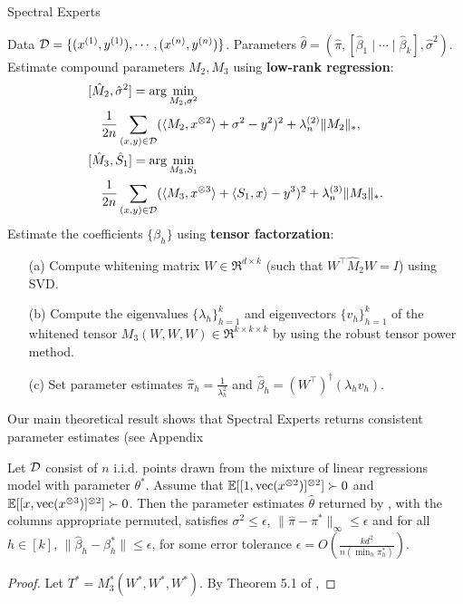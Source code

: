 \begin{algorithm}[t]
  \caption{Spectral Experts}
  \label{algo:spectral-experts}
  \begin{algorithmic}[1]
    \INPUT Data $\mathcal{D} = \{ (x^{(1)}, y^{(1)}), \cdots, (x^{(n)}, y^{(n)}) \}$.
    \OUTPUT Parameters $\hat\theta = (\hat \pi, [\hat \beta_1 \mid \cdots \mid \hat \beta_k], \hat\sigma^2)$.
    \STATE Estimate compound parameters $M_2, M_3$ using \textbf{low-rank regression}:
    \begin{align}
      &[\hat M_2, \hat \sigma^2] = \arg\min_{M_2,\sigma^2} \label{eqn:estimateM2} \\
      &\quad\frac{1}{2n} \sum_{(x,y) \in \mathcal{D}} (\langle M_2, x^{\otimes 2} \rangle + \sigma^2 - y^2)^2 + \lambda_n^{(2)} \|M_2\|_*, \nonumber \\
       &[\hat M_3, \hat S_1] = \arg\min_{M_3,S_1} \label{eqn:estimateM3} \\
       &\quad\frac{1}{2n} \sum_{(x,y) \in \mathcal{D}} (\langle M_3, x^{\otimes 3} \rangle + \langle S_1, x \rangle - y^3)^2 + \lambda_n^{(3)} \|M_3\|_*. \nonumber
    \end{align}
    \STATE Estimate the coefficients $\{\beta_h\}$ using \textbf{tensor factorzation}:
    \begin{enumerate}
      \item [(a)] Compute whitening matrix $W \in \Re^{d \times k}$ (such that $W^\top
      \hat M_2 W = I$) using SVD.
      \item [(b)] Compute the eigenvalues $\{\lambda_h\}_{h=1}^k$
      and eigenvectors $\{v_h\}_{h=1}^k$
      of the whitened tensor $M_3(W, W, W) \in \Re^{k \times k \times k}$
      by using the robust tensor power method.
    \item [(c)] Set parameter estimates $\hat\pi_h = \frac{1}{\lambda_h^2}$
    and $\hat\beta_h = (W^{\top})^\dagger (\lambda_h v_h)$.
    \end{enumerate}
  \end{algorithmic}
\end{algorithm}

Our main theoretical result shows that Spectral Experts returns
consistent parameter estimates (see Appendix
\begin{theorem}
Let $\mathcal{D}$ consist of $n$ i.i.d. points drawn from the mixture
of linear regressions model with parameter $\theta^*$.
Assume that $\operatorname{\mathbb{E}}[[1,\operatorname{vec}(x^{\otimes 2})]^{\otimes 2}] \succ 0$ 
and $\operatorname{\mathbb{E}}[[x,\operatorname{vec}(x^{\otimes 3})]^{\otimes 2}] \succ 0$.
Then the parameter estimates $\hat\theta$ returned by
, with the columns appropriate permuted,
satisfies $\sigma^2 \le \epsilon$,
$\|\hat\pi - \pi^*\|_{\infty} \le \epsilon$
and for all $h \in [k]$,
$\|\hat\beta_h - \beta^*_h\| \le \epsilon$,
for some error tolerance $\epsilon = O(\frac{kd^2}{n (\min_h \pi_h^*)})$.
\end{theorem}
\begin{proof}
Let $T^* = M_3^*(W^*, W^*, W^*)$.
By Theorem 5.1 of \cite{AnandkumarGeHsu2012},
\end{proof}

